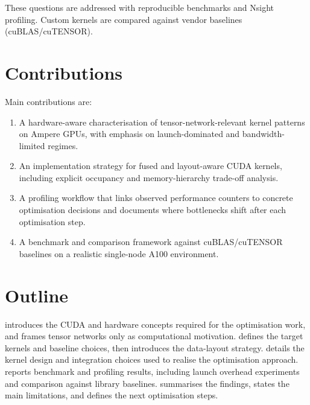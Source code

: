 These questions are addressed with reproducible benchmarks and Nsight
profiling. Custom kernels are compared against vendor baselines
(cuBLAS/cuTENSOR).

\section{Contributions}\label{sec:contributions}

Main contributions are:

\begin{enumerate}
  \item A hardware-aware characterisation of tensor-network-relevant kernel
    patterns on Ampere GPUs, with emphasis on launch-dominated and
    bandwidth-limited regimes.
  \item An implementation strategy for fused and layout-aware CUDA kernels,
    including explicit occupancy and memory-hierarchy trade-off analysis.
  \item A profiling workflow that links observed performance counters to
    concrete optimisation decisions and documents where bottlenecks shift after
    each optimisation step.
  \item A benchmark and comparison framework against cuBLAS/cuTENSOR baselines
    on a realistic single-node A100 environment.
\end{enumerate}

\section{Outline}\label{sec:outline}
 introduces the CUDA and hardware concepts required for the
optimisation work, and frames tensor networks only as computational motivation.
 defines the target kernels and baseline choices, then
introduces the data-layout strategy.
 details the kernel design and integration choices used
to realise the optimisation approach.
 reports benchmark and profiling results, including launch
overhead experiments and comparison against library baselines.
 summarises the findings, states the main limitations, and
defines the next optimisation steps.
